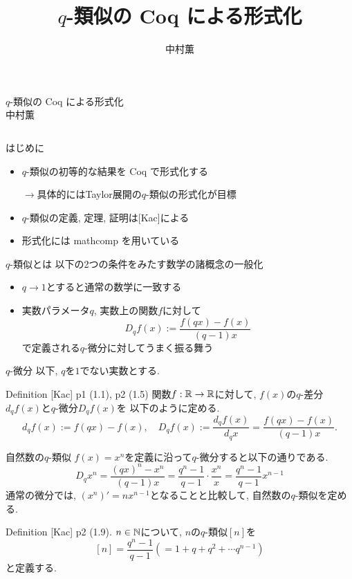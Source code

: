 \documentclass[unicode,mathserif]{beamer}
\title{$q$-類似の Coq による形式化}
\author{中村薫}
\begin{document}
\begin{frame}[fragile]
    \begin{center}
      {\Huge $q$-類似の Coq による形式化} \\
      {\Large 中村薫} 
    \end{center}

	\begin{columns}[T]
		\begin{column}{0.33\columnwidth}
			\begin{block}{はじめに}
				\begin{itemize}
				\item $q$-類似の初等的な結果を Coq で形式化する 
				
					$\to$具体的にはTaylor展開の$q$-類似の形式化が目標 
				\item $q$-類似の定義, 定理, 証明は[Kac]による
				\item 形式化には mathcomp を用いている 
				\end{itemize}
			\end{block}
			
		\begin{block}{$q$-類似とは}
			以下の2つの条件をみたす数学の諸概念の一般化
			\begin{itemize}
				\item $q \to 1$とすると通常の数学に一致する
	          \item 実数パラメータ$q$, 実数上の関数$f$に対して
					\[
						D_q f(x) := \frac{f(qx) - f(x)}{(q - 1) x}
					\]
					で定義される$q$-微分に対してうまく振る舞う
			\end{itemize}
		\end{block}

		\begin{block}{$q$-微分}
			以下, $q$を$1$でない実数とする.
			\begin{itembox}{Definition [Kac] p1 (1.1), p2 (1.5)}
				関数$f : \mathbb R \to \mathbb R$に対して, $f(x)$の$q$-差分$d_q f(x)$と$q$-微分$D_q f(x)$を
				以下のように定める.  
				\[
					d_q f(x) := f (qx) - f(x), \quad
					D_q f(x) := \frac{d_q f(x)}{d_q x} = \frac{f(qx) - f(x)}{(q - 1) x}.
				\]
			\end{itembox}
		\end{block}
   
		\begin{block}{自然数の$q$-類似}
			$f(x) = x^n$を定義に沿って$q$-微分すると以下の通りである. 
			\[
				D_q x^n = \frac{(qx)^n - x^n}{(q - 1) x}
								= \frac{q^n - 1}{q - 1} \cdot \frac{x^n}{x}
								= \frac{q^n - 1}{q - 1} x^{n - 1}
			\]
			通常の微分では, $(x^n)' = n x^{n - 1}$となることと比較して, 
			自然数の$q$-類似を定める.
			\begin{itembox}{Definition [Kac] p2 (1.9)}.
				$n \in \mathbb N$について, $n$の$q$-類似$[n]$を
				\[
					[n] = \frac{q^n - 1}{q - 1} (= 1 + q + q^2 + \cdots q^{n - 1})
				\]
				と定義する. 
			\end{itembox}
		\end{block}


\end{column}
\end{columns}
\end{frame}
\end{document}
